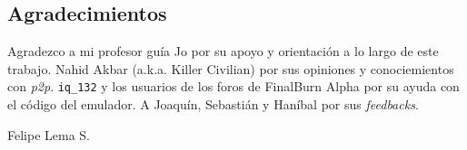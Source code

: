 \documentclass[12pt,spanish,letterpaper,color]{uchile}
\begin{document}
\begin{preface} 


\section{Agradecimientos}
Agradezco a mi profesor guía Jo por su apoyo y orientación a lo largo de este trabajo. Nahid
Akbar (a.k.a. Killer Civilian) por sus opiniones y conociemientos con \kai \textit{p2p}.
\texttt{iq\_132} y los usuarios de los foros de FinalBurn Alpha por su ayuda con el código del
emulador. A Joaquín, Sebastián y Haníbal por sus \textit{feedbacks}.\\

\begin{flushright}
Felipe Lema S.
\end{flushright}
\tableofcontents
\listoffigures

\end{preface}







{}

\end{document}
